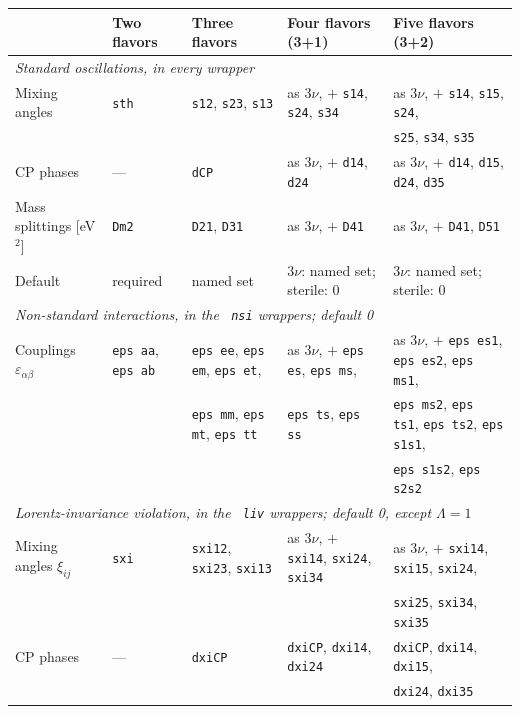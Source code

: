 \documentclass[final,5p,times,twocolumn,sort,compress]{elsarticle}
\makeatletter
\DeclareRobustCommand{\_}{%
  \ifmmode\nfss@text{\textunderscore}\else\textunderscore\allowbreak\fi}
\makeatother
\begin{document}
\begin{table}[t!]
\centering
\footnotesize
\renewcommand{\arraystretch}{1.15}
\begin{tabular}{l l l l l}
 & \textbf{Two flavors} & \textbf{Three flavors} & \textbf{Four flavors (3+1)} & \textbf{Five flavors (3+2)} \\
\hline
\multicolumn{5}{l}{\emph{Standard oscillations, in every wrapper}} \\
Mixing angles & {\tt sth} & {\tt s12}, {\tt s23}, {\tt s13} & as 3$\nu$, $+$ {\tt s14}, {\tt s24}, {\tt s34} & as 3$\nu$, $+$ {\tt s14}, {\tt s15}, {\tt s24}, \\
 & & & & {\tt s25}, {\tt s34}, {\tt s35} \\
CP phases & --- & {\tt dCP} & as 3$\nu$, $+$ {\tt d14}, {\tt d24} & as 3$\nu$, $+$ {\tt d14}, {\tt d15}, {\tt d24}, {\tt d35} \\
Mass splittings [eV$^2$] & {\tt Dm2} & {\tt D21}, {\tt D31} & as 3$\nu$, $+$ {\tt D41} & as 3$\nu$, $+$ {\tt D41}, {\tt D51} \\
Default & required & named set & 3$\nu$: named set; sterile: 0 & 3$\nu$: named set; sterile: 0 \\
\hline
\multicolumn{5}{l}{\emph{Non-standard interactions, in the {\tt \_nsi} wrappers; default 0}} \\
Couplings $\varepsilon_{\alpha\beta}$ & {\tt eps\_aa}, {\tt eps\_ab} & {\tt eps\_ee}, {\tt eps\_em}, {\tt eps\_et}, & as 3$\nu$, $+$ {\tt eps\_es}, {\tt eps\_ms}, & as 3$\nu$, $+$ {\tt eps\_es1}, {\tt eps\_es2}, {\tt eps\_ms1}, \\
 & & {\tt eps\_mm}, {\tt eps\_mt}, {\tt eps\_tt} & {\tt eps\_ts}, {\tt eps\_ss} & {\tt eps\_ms2}, {\tt eps\_ts1}, {\tt eps\_ts2}, {\tt eps\_s1s1}, \\
 & & & & {\tt eps\_s1s2}, {\tt eps\_s2s2} \\
\hline
\multicolumn{5}{l}{\emph{Lorentz-invariance violation, in the {\tt \_liv} wrappers; default 0, except $\Lambda = 1$}} \\
Mixing angles $\xi_{ij}$ & {\tt sxi} & {\tt sxi12}, {\tt sxi23}, {\tt sxi13} & as 3$\nu$, $+$ {\tt sxi14}, {\tt sxi24}, {\tt sxi34} & as 3$\nu$, $+$ {\tt sxi14}, {\tt sxi15}, {\tt sxi24}, \\
 & & & & {\tt sxi25}, {\tt sxi34}, {\tt sxi35} \\
CP phases & --- & {\tt dxiCP} & {\tt dxiCP}, {\tt dxi14}, {\tt dxi24} & {\tt dxiCP}, {\tt dxi14}, {\tt dxi15}, \\
 & & & & {\tt dxi24}, {\tt dxi35} \\

\end{tabular}
\end{table}
\end{document}
